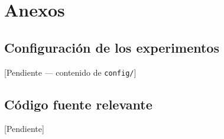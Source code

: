 \chapter{Anexos}
\label{cap:anexos}

\section{Configuración de los experimentos}
[Pendiente — contenido de \texttt{config/}]

\section{Código fuente relevante}
[Pendiente]
